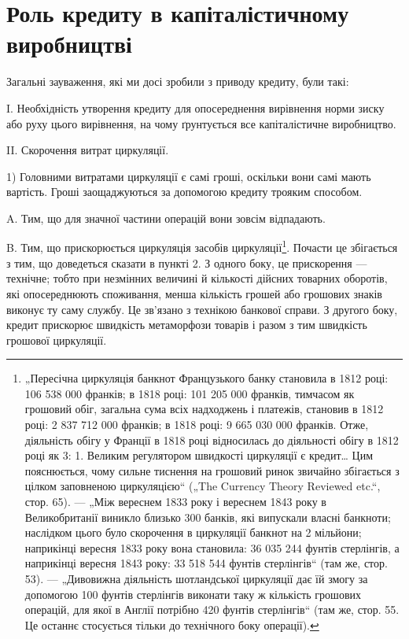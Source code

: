 
\section{Роль кредиту в капіталістичному виробництві}

Загальні зауваження, які ми досі зробили з приводу кредиту,
були такі:

I. Необхідність утворення кредиту для опосереднення вирівнення норми зиску або руху цього
вирівнення, на чому ґрунтується все капіталістичне виробництво.

II. Скорочення витрат циркуляції.

1) Головними витратами циркуляції є самі гроші, оскільки
вони самі мають вартість. Гроші заощаджуються за допомогою
кредиту трояким способом.

A. Тим, що для значної частини операцій вони зовсім відпадають.

B. Тим, що прискорюється циркуляція засобів циркуляції\footnote{
„Пересічна циркуляція банкнот Французького банку становила в 1812 році:
106 538 000 франків; в 1818 році: 101 205 000 франків, тимчасом як грошовий обіг,
загальна сума всіх надходжень і платежів, становив в 1812 році: 2 837 712 000
франків; в 1818 році: 9 665 030 000 франків. Отже, діяльність обігу у Франції
в 1818 році відносилась до діяльності обігу в 1812 році як 3: 1. Великим регулятором швидкості
циркуляції є кредит\dots{} Цим пояснюється, чому сильне тиснення на грошовий ринок звичайно збігається з
цілком заповненою циркуляцією“ („The Currency Theory Reviewed etc.“, стор. 65). — „Між вереснем 1833
року
і вереснем 1843 року в Великобританії виникло близько 300 банків, які випускали власні банкноти;
наслідком цього було скорочення в циркуляції банкнот
на 2 мільйони; наприкінці вересня 1833 року вона становила: 36 035 244 фунтів стерлінгів, а
наприкінці вересня 1843 року: 33 518 544 фунтів стерлінгів“
(там же, стор. 53). — „Дивовижна діяльність шотландської циркуляції дає їй
змогу за допомогою 100 фунтів стерлінгів виконати таку ж кількість грошових
операцій, для якої в Англії потрібно 420 фунтів стерлінгів“ (там же, стор. 55.
Це останнє стосується тільки до технічного боку операції).
}.
Почасти це збігається з тим, що доведеться сказати в пункті 2.
З одного боку, це прискорення — технічне; тобто при незмінних
величині й кількості дійсних товарних оборотів, які опосереднюють споживання, менша кількість грошей
або грошових знаків
виконує ту саму службу. Це зв’язано з технікою банкової справи.
З другого боку, кредит прискорює швидкість метаморфози товарів і разом з тим швидкість грошової
циркуляції.

